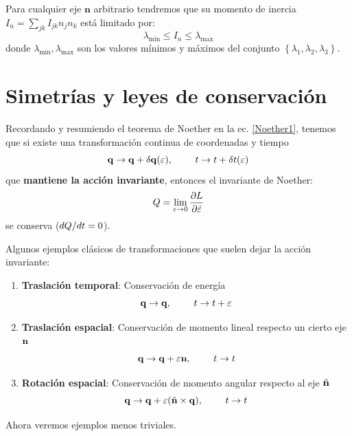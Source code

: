 \documentclass[]{article}
\numberwithin{equation}{section}
\begin{document}
Para cualquier eje \(\mathbf{n}\) arbitrario tendremos que su momento de inercia \(I_{n} = \sum_{jk} I_{jk} n_{j} n_{k}\) está limitado por:
\begin{equation}
	\lambda_{\mathrm{min}} \leq I_{n} \leq \lambda_{\mathrm{max}}
\end{equation}
donde \(\lambda_{\mathrm{min}}, \lambda_{\mathrm{max}}\) son los valores mínimos y máximos del conjunto \(\left\lbrace \lambda_{1},\lambda_{2},\lambda_{3} \right\rbrace\).


\section{Simetrías y leyes de conservación}
Recordando y resumiendo el teorema de Noether en la ec. \ref{Noether1}, tenemos que si existe una transformación continua de coordenadas y tiempo
\begin{equation}
	\mathbf{q} \rightarrow \mathbf{q} + \delta\mathbf{q}(\varepsilon), ~~~~~~~ t \rightarrow t + \delta t(\varepsilon)
\end{equation}
que \textbf{mantiene la acción invariante}, entonces el invariante de Noether:
\begin{equation}
	Q = \lim_{\varepsilon \rightarrow 0} \dfrac{\partial L}{\partial \dot{\varepsilon}}
\end{equation}
se conserva (\(d Q/d t = 0\)).

Algunos ejemplos clásicos de transformaciones que suelen dejar la acción invariante:
\begin{enumerate}
	\item \textbf{Traslación temporal}: Conservación de energía
	\begin{equation*}
		\mathbf{q} \rightarrow \mathbf{q}, ~~~~~~~ t \rightarrow t + \varepsilon
	\end{equation*}
	\item \textbf{Traslación espacial}: Conservación de momento lineal respecto un cierto eje \(\mathbf{n}\)
	\begin{equation*}
	\mathbf{q} \rightarrow \mathbf{q} + \varepsilon \mathbf{n}, ~~~~~~~ t \rightarrow t
	\end{equation*}
	\item \textbf{Rotación espacial}: Conservación de momento angular respecto al eje \(\hat{\mathbf{n}}\)
	\begin{equation*}
	\mathbf{q} \rightarrow \mathbf{q} + \varepsilon(\hat{\mathbf{n}}\times\mathbf{q}), ~~~~~~~ t \rightarrow t
	\end{equation*}
\end{enumerate}
Ahora veremos ejemplos menos triviales.
\end{document}
